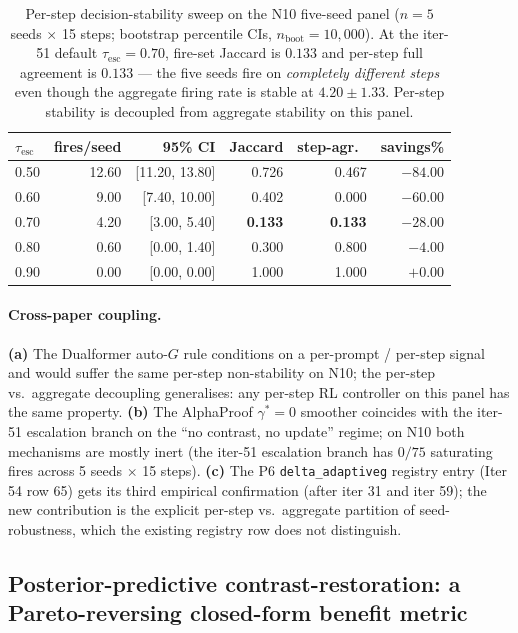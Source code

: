 \begin{table}[t]
\centering
\caption{Per-step decision-stability sweep on the N10 five-seed
panel ($n{=}5$ seeds $\times$ 15 steps; bootstrap percentile CIs,
$n_{\text{boot}}{=}10{,}000$).  At the iter-51 default
$\tau_{\mathrm{esc}}{=}0.70$, fire-set Jaccard is $0.133$ and
per-step full agreement is $0.133$ --- the five seeds fire on
\emph{completely different steps} even though the aggregate
firing rate is stable at $4.20 \pm 1.33$.  Per-step stability
is decoupled from aggregate stability on this panel.}
\label{tab:p7-tau-decision-stability}
\begin{tabular}{lrrrrr}
\toprule
$\tau_{\mathrm{esc}}$ & fires/seed & 95\% CI & Jaccard & step-agr.\ & savings\% \\
\midrule
0.50 & 12.60 & [11.20, 13.80] & 0.726 & 0.467 & $-84.00$ \\
0.60 &  9.00 &  [7.40, 10.00] & 0.402 & 0.000 & $-60.00$ \\
0.70 &  4.20 &  [3.00,  5.40] & \textbf{0.133} & \textbf{0.133} & $-28.00$ \\
0.80 &  0.60 &  [0.00,  1.40] & 0.300 & 0.800 &  $-4.00$ \\
0.90 &  0.00 &  [0.00,  0.00] & 1.000 & 1.000 &  $+0.00$ \\
\bottomrule
\end{tabular}
\end{table}

\paragraph{Cross-paper coupling.}
\textbf{(a)} The Dualformer auto-$G$ rule
\citep{su2024dualformer} conditions on a per-prompt /
per-step signal and would suffer the same per-step
non-stability on N10; the per-step vs.\ aggregate
decoupling generalises: any per-step RL controller on
this panel has the same property.  \textbf{(b)} The
AlphaProof $\gamma^*{=}0$ smoother \citep{alphaproof2025nature}
coincides with the iter-51 escalation branch on the
``no contrast, no update'' regime; on N10 both
mechanisms are mostly inert (the iter-51 escalation
branch has $0/75$ saturating fires across 5 seeds
$\times$ 15 steps).  \textbf{(c)} The P6
\texttt{delta\_adaptiveg} registry entry
(Iter 54 row 65) gets its third empirical
confirmation (after iter 31 and iter 59); the new
contribution is the explicit per-step vs.\ aggregate
partition of seed-robustness, which the existing
registry row does not distinguish.

\subsection{Posterior-predictive contrast-restoration: a Pareto-reversing
closed-form benefit metric}
\label{sec:p7-postpred}

